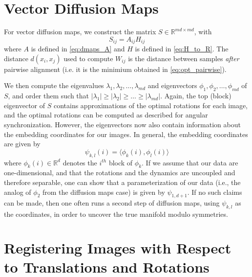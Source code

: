 \documentclass{pnastwo}
\begin{document}
\begin{article}
\begin{materials}
\section{Vector Diffusion Maps \cite{singer2012vector}}

For vector diffusion maps, we construct the matrix $S \in \mathbb{R}^{md \times md}$, with
\begin{equation}
	S_{ij} = A_{ij} H_{ij}
\end{equation}
%
where $A$ is defined in \eqref{eq:dmaps_A} and $H$ is defined in \eqref{eq:H_to_R}.
%
The distance $d(x_i, x_j)$ used to compute $W_{ij}$ is the distance between samples {\em after} pairwise alignment (i.e. it is the minimium obtained in \eqref{eq:opt_pairwise}). 

We then compute the eigenvalues $\lambda_1, \lambda_2, \dots, \lambda_{md}$ and eigenvectors $\phi_1, \phi_2, \dots, \phi_{md}$ of $S$, and order them such that $|\lambda_1| \ge |\lambda_2| \ge \dots \ge |\lambda_{md}|$.
%
Again, the top (block) eigenvector of $S$ contains approximations of the optimal rotations for each image, and the optimal rotations can be computed as described for angular synchronization.
%
However, the eigenvectors now also contain information about the embedding coordinates for our images.
%
In general, the embedding coordinates are given by 
\begin{equation}
\psi_{k,l} (i) = \langle \phi_k(i), \phi_l(i) \rangle
\end{equation}
where $\phi_k(i) \in \mathbb{R}^d$ denotes the $i^{th}$ block of $\phi_k$.
%
If we assume that our data are one-dimensional, and that the rotations and the dynamics are uncoupled and therefore separable, one can show that a parameterization of our data (i.e., the analog of $\phi_2$ from the diffusion maps case) is given by $\psi_{1,d+1}$.
%
If no such claims can be made, then one often runs a second step of diffusion maps, using $\psi_{k,l}$ as the coordinates, in order to uncover the true manifold modulo symmetries. 

\section{Registering Images with Respect to Translations and Rotations} \label{subsec:trans_rot_register}


\end{materials}
\end{article}
\end{document}
